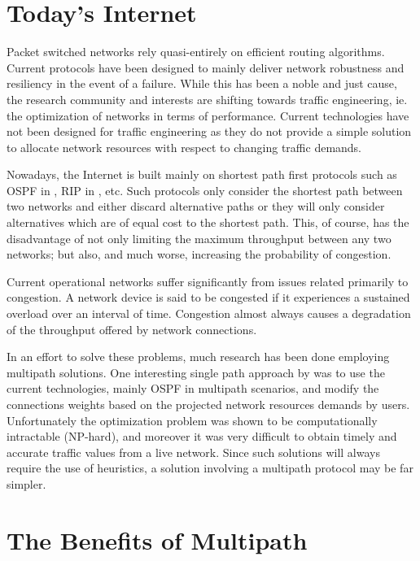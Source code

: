\section{Today's Internet}

Packet switched networks rely quasi-entirely on efficient routing algorithms.
Current protocols have been designed to mainly deliver network robustness and
resiliency in the event of a failure. While this has been a noble and just
cause, the research community and interests are shifting towards traffic
engineering, ie. the optimization of networks in terms of performance. Current
technologies have not been designed for traffic engineering as they do not
provide a simple solution to allocate network resources with respect to changing
traffic demands. 

Nowadays, the Internet is built mainly on shortest path first protocols such as
OSPF in \cite{OSPF}, RIP in \cite{RIP} , etc. Such protocols only consider the
shortest path between two networks and either discard alternative paths or they
will only consider alternatives which are of equal cost to the shortest path.
This, of course, has the disadvantage of not only limiting the maximum throughput between
any two networks; but also, and much worse, increasing the probability of
congestion. 

Current operational networks suffer significantly from issues related primarily 
to congestion. A network device is said to be congested if it experiences a
sustained overload over an interval of time. Congestion almost always causes a
degradation of the throughput offered by network connections. 

In an effort to solve these problems, much research has been done employing
multipath solutions. One interesting single path approach by 
\cite{TrafficEngOSPFWeights} was to use the current technologies, mainly OSPF in multipath scenarios,
and modify the connections weights based on the projected network resources
demands by users. Unfortunately the optimization problem was shown to be
computationally intractable (NP-hard), and moreover it was very difficult to
obtain timely and accurate traffic values from a live network. Since such
solutions will always require the use of heuristics, a solution involving a
multipath protocol may be far simpler. 

\section{The Benefits of Multipath}

